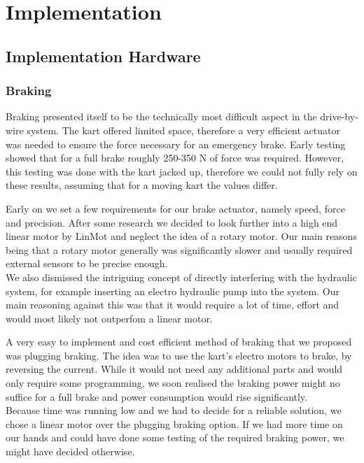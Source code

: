 
\chapter{Implementation}
\label{chp:Implementation}

\section{Implementation Hardware}

\subsection{Braking}

Braking presented itself to be the technically most difficult aspect in the drive-by-wire system. The kart offered limited space, therefore a very efficient actuator was needed to ensure the force necessary for an emergency brake. Early testing showed that for a full brake roughly 250-350 N of force was required. However, this testing was done with the kart jacked up, therefore we could not fully rely on these results, assuming that for a moving kart the values differ.

Early on we set a few requirements for our brake actuator, namely speed, force and precision. After some research we decided to look further into a high end linear motor by LinMot and neglect the idea of a rotary motor. Our main reasons being that a rotary motor generally was significantly slower and usually required external sensors to be precise enough.\\
We also dismissed the intriguing concept of directly interfering with the hydraulic system, for example inserting an electro hydraulic pump into the system. Our main reasoning against this was that it would require a lot of time, effort and would most likely not outperfom a linear motor.

A very easy to implement and cost efficient method of braking that we proposed was plugging braking. The idea was to use the kart's electro motors to brake, by reversing the current. While it would not need any additional parts and would only require some programming, we soon realised the braking power might no suffice for a full brake and power consumption would rise significantly. \\Because time was running low and we had to decide for a reliable solution, we chose a linear motor over the plugging braking option. If we had more time on our hands and could have done some testing of the required braking power, we might have decided otherwise.

